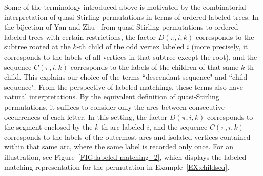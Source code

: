 \documentclass[11pt]{article}
\numberwithin{equation}{section}
\begin{document}
Some of the terminology introduced above is motivated by the combinatorial 
interpretation of quasi-Stirling permutations in terms of ordered labeled trees. 
In the bijection of Yan and Zhu~\cite{YanZhu2022} from quasi-Stirling permutations 
to ordered labeled trees with certain restrictions, the factor $D(\pi,i,k)$ 
corresponds to the subtree rooted at the $k$-th child of the odd vertex labeled $i$ 
(more precisely, it corresponds to the labels of all vertices in that subtree except 
the root), and the sequence $C(\pi,i,k)$ corresponds to the labels of the children 
of that same $k$-th child. This explains our choice of the terms ``descendant sequence" 
and ``child sequence".
From the perspective of labeled matchings, these terms also have natural interpretations. 
By the equivalent definition of quasi-Stirling permutations, it suffices to consider 
only the arcs between consecutive occurrences of each letter. 
In this setting, the factor $D(\pi,i,k)$ corresponds to the segment enclosed by the 
$k$-th arc labeled $i$, and the sequence $C(\pi,i,k)$ corresponds to the labels of 
the outermost arcs and isolated vertices contained within that same arc, where the same label is recorded only once. For an illustration, see Figure~\ref{FIG:labeled matching_2}, 
which displays the labeled matching representation for the permutation in 
Example~\ref{EX:childseq}.
\end{document}
